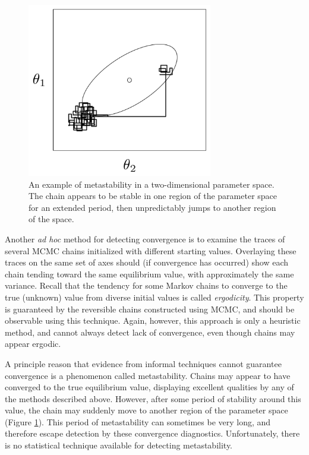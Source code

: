 \documentclass[]{book}
\begin{document}
\begin{figure}[h]
\begin{center}
\includegraphics[height=3in]{metastable.png}
\caption{An example of metastability in a two-dimensional parameter space. The chain appears to be stable in one region of the parameter space for an extended period, then unpredictably jumps to another region of the space.}
\label{fig:metas}
\end{center}
\end{figure}

Another \emph{ad hoc} method for detecting convergence is to examine the traces of several MCMC chains initialized with different starting values. Overlaying these traces on the same set of axes should (if convergence has occurred) show each chain tending toward the same equilibrium value, with approximately the same variance. Recall that the tendency for some Markov chains to converge to the true (unknown) value from diverse initial values is called \emph{ergodicity}. This property is guaranteed by the reversible chains constructed using MCMC, and should be observable using this technique. Again, however, this approach is only a heuristic method, and cannot always detect lack of convergence, even though chains may appear ergodic.

A principle reason that evidence from informal techniques cannot guarantee convergence is a phenomenon called metastability. Chains may appear to have converged to the true equilibrium value, displaying excellent qualities by any of the methods described above. However, after some period of stability around this value, the chain may suddenly move to another region of the parameter space (Figure \ref{fig:metas}). This period of metastability can sometimes be very long, and therefore escape detection by these convergence diagnostics. Unfortunately, there is no statistical technique available for detecting metastability.
\end{document}
